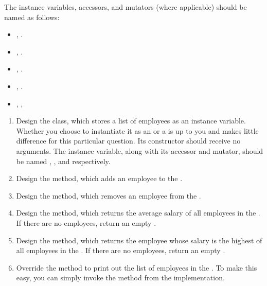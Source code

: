 The instance variables, accessors, and mutators (where applicable) should be named as follows:
\begin{itemize}
    \item {}, .
    \item {}, .
    \item {}, .
    \item {}, .
    \item {}, , 
\end{itemize}



\begin{enumerate}[label=(\alph*)]
    \item Design the  class, which stores a list of employees  as an instance variable. Whether you choose to instantiate it as an  or a  is up to you and makes little difference for this particular question. Its constructor should receive no arguments. The instance variable, along with its accessor and mutator, should be named , , and  respectively.
    \item Design the  method, which adds an employee to the .
    \item Design the  method, which removes an employee from the .
    \item Design the  method, which returns the average salary of all employees in the . If there are no employees, return an empty .
    \item Design the  method, which returns the employee whose salary is the highest of all employees in the . If there are no employees, return an empty .
    \item Override the  method to print out the list of employees in the . To make this easy, you can simply invoke the  method from the  implementation.
\end{enumerate}

